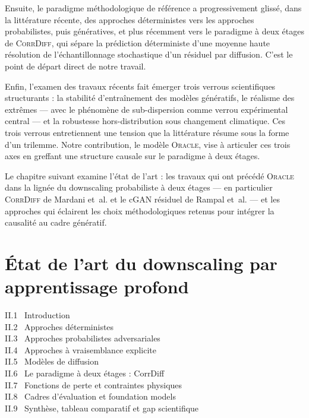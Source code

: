 \documentclass[14pt,a4paper,openany]{extreport}
\theoremstyle{definition}
\newcommand{\Oracle}{\textsc{Oracle}}
\newcommand{\CorrDiff}{\textsc{CorrDiff}}
\begin{document}
Ensuite, le paradigme méthodologique de référence a progressivement glissé, dans la littérature récente, des approches déterministes vers les approches probabilistes, puis génératives, et plus récemment vers le paradigme à deux étages de \CorrDiff{}, qui sépare la prédiction déterministe d'une moyenne haute résolution de l'échantillonnage stochastique d'un résiduel par diffusion. C'est le point de départ direct de notre travail.

Enfin, l'examen des travaux récents fait émerger trois verrous scientifiques structurants : la stabilité d'entraînement des modèles génératifs, le réalisme des extrêmes --- avec le phénomène de sub-dispersion comme verrou expérimental central --- et la robustesse hors-distribution sous changement climatique. Ces trois verrous entretiennent une tension que la littérature résume sous la forme d'un trilemme. Notre contribution, le modèle \Oracle{}, vise à articuler ces trois axes en greffant une structure causale sur le paradigme à deux étages.

Le chapitre suivant examine l'état de l'art : les travaux qui ont précédé \Oracle{} dans la lignée du downscaling probabiliste à deux étages --- en particulier \CorrDiff{} de Mardani et~al. et le cGAN résiduel de Rampal et~al. --- et les approches qui éclairent les choix méthodologiques retenus pour intégrer la causalité au cadre génératif.


\chapter{État de l'art du downscaling par apprentissage profond}
\label{chap:etatdelart}

\begin{sommairebox}
\small
\noindent II.1 \ Introduction \dotfill \pageref{sec:soa-intro}\\
\noindent II.2 \ Approches déterministes \dotfill \pageref{sec:soa-det}\\
\noindent II.3 \ Approches probabilistes adversariales \dotfill \pageref{sec:soa-adv}\\
\noindent II.4 \ Approches à vraisemblance explicite \dotfill \pageref{sec:soa-vrai}\\
\noindent II.5 \ Modèles de diffusion \dotfill \pageref{sec:soa-diff}\\
\noindent II.6 \ Le paradigme à deux étages : CorrDiff \dotfill \pageref{sec:soa-corrdiff}\\
\noindent II.7 \ Fonctions de perte et contraintes physiques \dotfill \pageref{sec:soa-pertes}\\
\noindent II.8 \ Cadres d'évaluation et foundation models \dotfill \pageref{sec:soa-benchmarks}\\
\noindent II.9 \ Synthèse, tableau comparatif et gap scientifique \dotfill \pageref{sec:soa-synthese}
\end{sommairebox}
\end{document}
